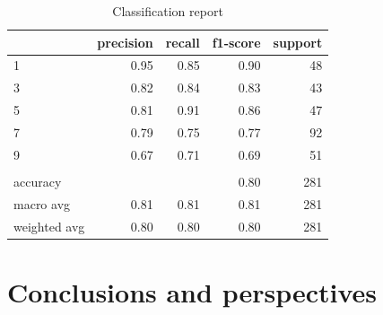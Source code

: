 \documentclass[english]{article}
\begin{document}
\begin{table}[H]
    \centering
    \caption{Classification report}
    \label{tab:oivcr}
    \begin{tabular}{lrrrr}
        \toprule
        {}           & precision & recall & f1-score & support \\
        \midrule
        1            & 0.95      & 0.85   & 0.90     & 48      \\
        3            & 0.82      & 0.84   & 0.83     & 43      \\
        5            & 0.81      & 0.91   & 0.86     & 47      \\
        7            & 0.79      & 0.75   & 0.77     & 92      \\
        9            & 0.67      & 0.71   & 0.69     & 51      \\
                     &           &        &          &         \\
        accuracy     &           &        & 0.80     & 281     \\
        macro avg    & 0.81      & 0.81   & 0.81     & 281     \\
        weighted avg & 0.80      & 0.80   & 0.80     & 281     \\
        \bottomrule
    \end{tabular}
\end{table}

\section{Conclusions and perspectives}

\end{document}
